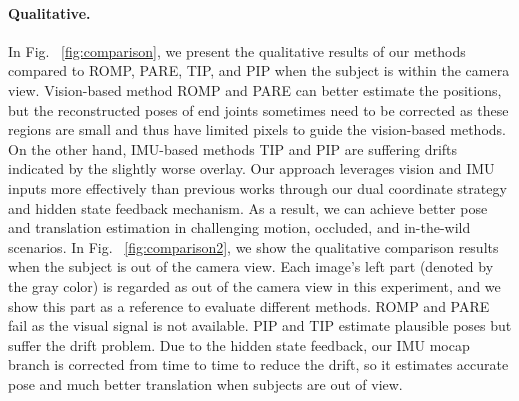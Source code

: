 \documentclass[sigconf,nonacm=true]{acmart}
\begin{document}
\paragraph{Qualitative.}
In Fig. ~\ref{fig:comparison}, we present the qualitative results of our methods compared to ROMP, PARE, TIP, and PIP when the subject is within the camera view.
Vision-based method ROMP and PARE can better estimate the positions, but the reconstructed poses of end joints sometimes need to be corrected as these regions are small and thus have limited pixels to guide the vision-based methods.
On the other hand, IMU-based methods TIP and PIP are suffering drifts indicated by the slightly worse overlay.
Our approach leverages vision and IMU inputs more effectively than previous works through our dual coordinate strategy and hidden state feedback mechanism.
As a result, we can achieve better pose and translation estimation in challenging motion, occluded, and in-the-wild scenarios.
In Fig. ~\ref{fig:comparison2}, we show the qualitative comparison results when the subject is out of the camera view.
Each image's left part (denoted by the gray color) is regarded as out of the camera view in this experiment, and we show this part as a reference to evaluate different methods.
ROMP and PARE fail as the visual signal is not available.
PIP and TIP estimate plausible poses but suffer the drift problem.
Due to the hidden state feedback, our IMU mocap branch is corrected from time to time to reduce the drift, so it estimates accurate pose and much better translation when subjects are out of view.
\end{document}
